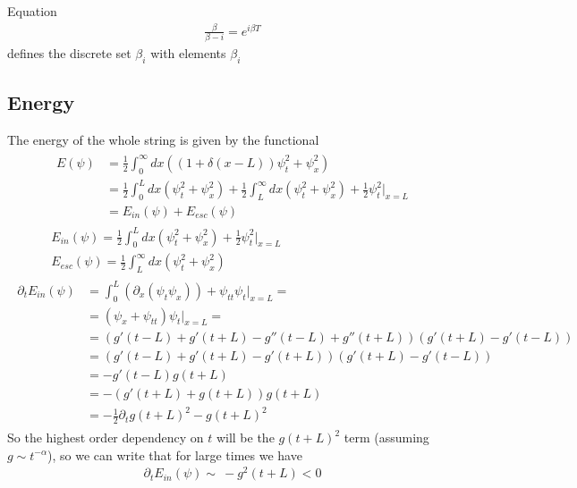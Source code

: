 \documentclass[
a4paper,%
10pt,%
titlepage,%
twoside%
]{article}
\begin{document}
Equation
\begin{gather}\label{eq:beta}
  \frac{\beta}{\beta-i}=e^{i\beta T}
\end{gather}
defines the discrete set ${\beta_i}$ with elements $\beta_i$

\subsection{Energy}
The energy of the whole string is given by the functional
\begin{gather}
  \begin{split}
    E(\psi)&=\frac{1}{2}\int_0^\infty dx ((1+\delta(x-L))\psi_t^2+\psi_x^2)\\
    &=\frac{1}{2}\int_0^L dx(\psi_t^2+\psi_x^2)+\frac{1}{2}\int_L^\infty dx(\psi_t^2+\psi_x^2)+\frac{1}{2}\psi_t^2\bigg|_{x=L}\\
    &=E_{in}(\psi)+E_{esc}(\psi)
  \end{split}\\
  E_{in}(\psi)=\frac{1}{2}\int_0^L dx(\psi_t^2+\psi_x^2)+\frac{1}{2}\psi_t^2\bigg|_{x=L}\\
  E_{esc}(\psi)=\frac{1}{2}\int_L^\infty dx(\psi_t^2+\psi_x^2)
\end{gather}
\begin{gather}
  \begin{split}\label{eq:enleak}
    \partial_t E_{in}(\psi)&=\int_0^L(\partial_x(\psi_t\psi_x))+\psi_{tt}\psi_t\bigg|_{x=L}=\\
    &=(\psi_x+\psi_{tt})\psi_t\bigg|_{x=L}=\\
    &=(g'(t-L)+g'(t+L)-g''(t-L)+g''(t+L))(g'(t+L)-g'(t-L))\\
    &=(g'(t-L)+g'(t+L)-g'(t+L))(g'(t+L)-g'(t-L))\\
    &=-g'(t-L)g(t+L)\\
    &=-(g'(t+L)+g(t+L))g(t+L)\\
    &=-\frac{1}{2}\partial_tg(t+L)^2-g(t+L)^2
  \end{split}
\end{gather}
So the highest order dependency on $t$ will be the $g(t+L)^2$ term (assuming $g\sim t^{-\alpha}$), so
we can write that for large times we have
\begin{gather}
  \partial_t E_{in}(\psi)\sim~-g^2(t+L)<0
\end{gather}
\end{document}
